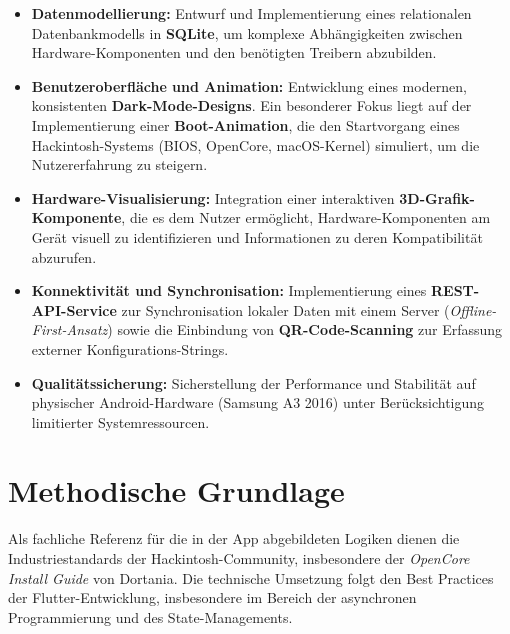 \begin{itemize}
    \item \textbf{Datenmodellierung:} Entwurf und Implementierung eines relationalen Datenbankmodells in \textbf{SQLite}, um komplexe Abhängigkeiten zwischen Hardware-Komponenten und den benötigten Treibern abzubilden.
    \item \textbf{Benutzeroberfläche und Animation:} Entwicklung eines modernen, konsistenten \textbf{Dark-Mode-Designs}. Ein besonderer Fokus liegt auf der Implementierung einer \textbf{Boot-Animation}, die den Startvorgang eines Hackintosh-Systems (BIOS, OpenCore, macOS-Kernel) simuliert, um die Nutzererfahrung zu steigern.
    \item \textbf{Hardware-Visualisierung:} Integration einer interaktiven \textbf{3D-Grafik-Komponente}, die es dem Nutzer ermöglicht, Hardware-Komponenten am Gerät visuell zu identifizieren und Informationen zu deren Kompatibilität abzurufen.
    \item \textbf{Konnektivität und Synchronisation:} Implementierung eines \textbf{REST-API-Service} zur Synchronisation lokaler Daten mit einem Server (\textit{Offline-First-Ansatz}) sowie die Einbindung von \textbf{QR-Code-Scanning} zur Erfassung externer Konfigurations-Strings.
    \item \textbf{Qualitätssicherung:} Sicherstellung der Performance und Stabilität auf physischer Android-Hardware (Samsung A3 2016) unter Berücksichtigung limitierter Systemressourcen.
\end{itemize}

\section{Methodische Grundlage}
Als fachliche Referenz für die in der App abgebildeten Logiken dienen die Industriestandards der Hackintosh-Community, insbesondere der \textit{OpenCore Install Guide} von Dortania. Die technische Umsetzung folgt den Best Practices der Flutter-Entwicklung, insbesondere im Bereich der asynchronen Programmierung und des State-Managements.